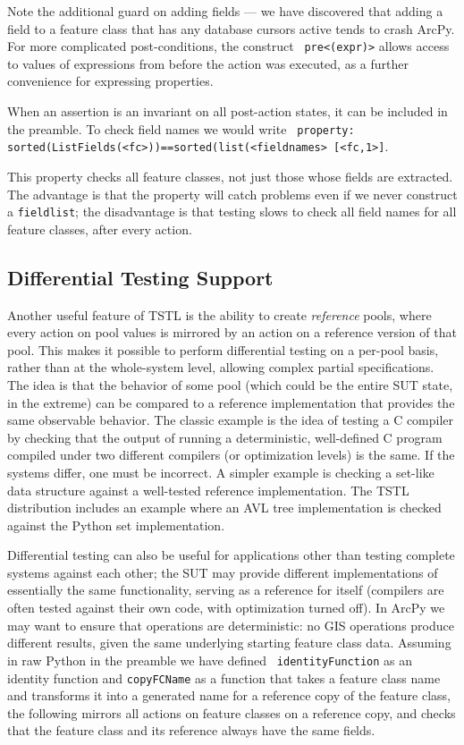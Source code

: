 Note the additional guard on adding fields --- we have discovered that
adding a field to a feature class that has any database cursors active
tends to crash ArcPy.  For more complicated post-conditions, the construct {\tt
  pre<(expr)>} allows access to values of expressions from before the
action was executed, as a further convenience for expressing properties.

When an assertion is an invariant on all post-action states, it can be
included in the preamble.  To check field names we would write {\tt
  property: sorted(ListFields(<fc>))==sorted(list(<fieldnames>
  [<fc,1>]}.

This property checks all feature classes, not just those whose
fields are extracted.  The advantage is that the property will
catch problems even if we never construct a {\tt fieldlist}; the
disadvantage is that testing slows to check all field names for all
feature classes, after every action.

\subsection{Differential Testing Support}
\label{sec:differential}

Another useful feature of TSTL is the ability to create
\emph{reference} pools, where every action on pool values is mirrored
by an action on a reference version of that pool.  This makes it
possible to perform differential testing \cite{Differential} on a
per-pool basis, rather than at the whole-system level, allowing
complex partial specifications.  The idea is that the behavior of some
pool (which could be the entire SUT state, in the extreme) can be
compared to a reference implementation that provides the same
observable behavior.  The classic example is the idea of testing a C
compiler by checking that the output of running a deterministic, well-defined
C program compiled under two different compilers (or optimization
levels) is the same.  If the systems differ, one must be incorrect.  A
simpler example is checking a set-like data structure against a
well-tested reference implementation.  The TSTL distribution includes
an example where an AVL tree implementation is checked against the
Python set implementation.

Differential testing can also be useful for applications other than
testing complete systems against each other; the SUT may provide
different implementations of essentially the same functionality,
serving as a reference for itself (compilers are often tested against
their own code, with optimization turned off). In ArcPy we may want to
ensure that operations are deterministic: no GIS operations produce
different results, given the same underlying starting feature class
data.  Assuming in raw Python in the preamble we have defined {\tt
  identityFunction} as an identity function and {\tt copyFCName} as a
function that takes a feature class name and transforms it into a
generated name for a reference copy of the feature class, the
following mirrors all actions on feature classes on a reference copy,
and checks that the feature class and its reference always have the
same fields.

